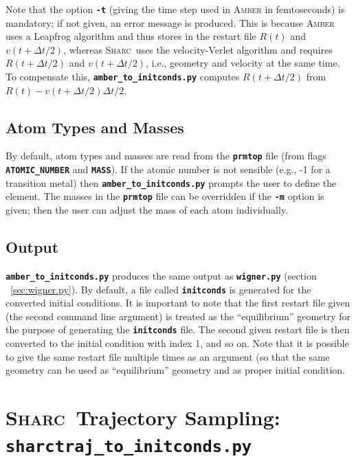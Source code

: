\documentclass[a4paper,10pt,DIV=15,openany,twoside=false]{scrbook}
\newcommand{\sharc}{\textsc{Sharc}}
\newcommand{\ttt}[1]{\textbf{\texttt{#1}}}
\begin{document}
Note that the option \ttt{-t} (giving the time step used in \textsc{Amber} in femtoseconds) is mandatory; if not given, an error message is produced.
This is because \textsc{Amber} uses a Leapfrog algorithm and thus stores in the restart file $R(t)$ and $v(t+\Delta t/2)$, whereas \sharc\ uses the velocity-Verlet algorithm and requires $R(t+\Delta t/2)$ and $v(t+\Delta t/2)$, i.e., geometry and velocity at the same time.
To compensate this, \ttt{amber\_to\_initconds.py} computes $R(t+\Delta t/2)$ from $R(t)-v(t+\Delta t/2)\Delta t/2$.

\subsection{Atom Types and Masses}

By default, atom types and masses are read from the \ttt{prmtop} file (from flags \ttt{ATOMIC\_NUMBER} and \ttt{MASS}). 
If the atomic number is not sensible (e.g., -1 for a transition metal) then \ttt{amber\_to\_initconds.py} prompts the user to define the element.
The masses in the \ttt{prmtop} file can be overridden if the \ttt{-m} option is given; then the user can adjust the mass of each atom individually.

\subsection{Output}

\ttt{amber\_to\_initconds.py} produces the same output as \ttt{wigner.py} (section ~\ref{sec:wigner.py}).
By default, a file called \ttt{initconds} is generated for the converted initial conditions. 
It is important to note that the first restart file given (the second command line argument) is treated as the ``equilibrium'' geometry for the purpose of generating the \ttt{initconds} file.
The second given restart file is then converted to the initial condition with index 1, and so on.
Note that it is possible to give the same restart file multiple times as an argument (so that the same geometry can be used as ``equilibrium'' geometry and as proper initial condition.





\section{\sharc\ Trajectory Sampling: \ttt{sharctraj\_to\_initconds.py}}\label{sec:sharctraj_to_initconds.py}
\end{document}
